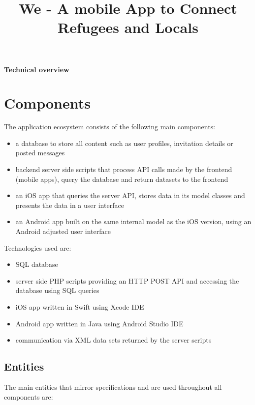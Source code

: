 \documentclass[12pt]{scrartcl}
\title{We - A mobile App to Connect Refugees and Locals}
\begin{document}
	
\maketitle

\begin{center}
	\large \textbf{Technical overview}
\end{center}

\tableofcontents
	
\newpage
\section{Components}

The application ecosystem consists of the following main components:

\begin{itemize}
	\item a database to store all content such as user profiles, invitation details or posted messages
	\item backend server side scripts that process API calls made by the frontend (mobile apps), query the database and return datasets to the frontend
	\item an iOS app that queries the server API, stores data in its model classes and presents the data in a user interface
	\item an Android app built on the same internal model as the iOS version, using an Android adjusted user interface
	
\end{itemize}

Technologies used are:

\begin{itemize}
	\item SQL database
	\item server side PHP scripts providing an HTTP POST API and accessing the database using SQL queries
	\item iOS app written in Swift using Xcode IDE
	\item Android app written in Java using Android Studio IDE
	\item communication via XML data sets returned by the server scripts
\end{itemize}

\subsection{Entities}

The main entities that mirror specifications and are used throughout all components are:
\end{document}
